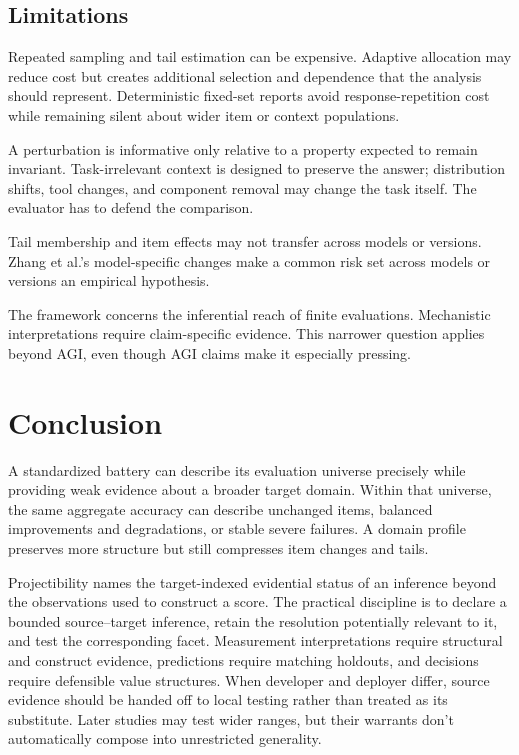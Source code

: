 \documentclass[12pt]{article}
\begin{document}
\subsection{Limitations}\label{sec:limitations}

Repeated sampling and tail estimation can be expensive. Adaptive allocation may reduce cost but creates additional selection and dependence that the analysis should represent. Deterministic fixed-set reports avoid response-repetition cost while remaining silent about wider item or context populations.

A perturbation is informative only relative to a property expected to remain invariant. Task-irrelevant context is designed to preserve the answer; distribution shifts, tool changes, and component removal may change the task itself. The evaluator has to defend the comparison.

Tail membership and item effects may not transfer across models or versions. Zhang et al.'s model-specific changes make a common risk set across models or versions an empirical hypothesis.

The framework concerns the inferential reach of finite evaluations. Mechanistic interpretations require claim-specific evidence. This narrower question applies beyond AGI, even though AGI claims make it especially pressing.

\section{Conclusion}\label{sec:conclusion}

A standardized battery can describe its evaluation universe precisely while providing weak evidence about a broader target domain. Within that universe, the same aggregate accuracy can describe unchanged items, balanced improvements and degradations, or stable severe failures. A domain profile preserves more structure but still compresses item changes and tails.

Projectibility names the target-indexed evidential status of an inference beyond the observations used to construct a score. The practical discipline is to declare a bounded source--target inference, retain the resolution potentially relevant to it, and test the corresponding facet. Measurement interpretations require structural and construct evidence, predictions require matching holdouts, and decisions require defensible value structures. When developer and deployer differ, source evidence should be handed off to local testing rather than treated as its substitute. Later studies may test wider ranges, but their warrants don't automatically compose into unrestricted generality.
\end{document}
